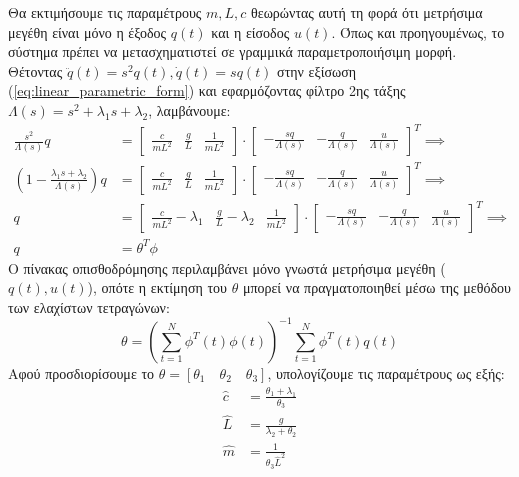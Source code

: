 \documentclass[a4paper,12pt]{article}
\begin{document}
Θα εκτιμήσουμε τις παραμέτρους $m, L, c$ θεωρώντας αυτή τη φορά ότι μετρήσιμα μεγέθη είναι μόνο η έξοδος $q(t)$ και η είσοδος $u(t)$. Όπως και προηγουμένως, το σύστημα πρέπει να μετασχηματιστεί σε γραμμικά παραμετροποιήσιμη μορφή. Θέτοντας $\ddot{q}(t) = s^2q(t), \dot{q}(t) = sq(t)$ στην εξίσωση (\ref{eq:linear_parametric_form}) και εφαρμόζοντας φίλτρο 2ης τάξης $\Lambda(s) = s^2 + \lambda_1 s + \lambda_2$, λαμβάνουμε:
\begin{equation}
\begin{aligned}
    \frac{s^2}{\Lambda(s)}q &=
    \left[
    \begin{matrix}
        \frac{c}{mL^2} & \frac{g}{L} & \frac{1}{mL^2}
    \end{matrix}
    \right]
    \cdot
    \left[
    \begin{matrix}
        -\frac{sq}{\Lambda(s)} & -\frac{q}{\Lambda(s)} & \frac{u}{\Lambda(s)}
    \end{matrix}
    \right]^T 
    \implies \\
    \left(1 - \frac{\lambda_1s + \lambda_2}{\Lambda(s)}\right)q &=
    \left[
    \begin{matrix}
        \frac{c}{mL^2} & \frac{g}{L} & \frac{1}{mL^2}
    \end{matrix}
    \right]
    \cdot
    \left[
    \begin{matrix}
        -\frac{sq}{\Lambda(s)} & -\frac{q}{\Lambda(s)} & \frac{u}{\Lambda(s)}
    \end{matrix}
    \right]^T
    \implies \\
    q &=
    \left[
    \begin{matrix}
        \frac{c}{mL^2}-\lambda_1 & \frac{g}{L}-\lambda_2 & \frac{1}{mL^2}
    \end{matrix}
    \right]
    \cdot
    \left[
    \begin{matrix}
        -\frac{sq}{\Lambda(s)} & -\frac{q}{\Lambda(s)} & \frac{u}{\Lambda(s)}
    \end{matrix}
    \right]^T
    \implies \\
    q &= \theta^T \phi
    \label{eq:linear_parametric_form3}   
\end{aligned}
\end{equation}
Ο πίνακας οπισθοδρόμησης περιλαμβάνει μόνο γνωστά μετρήσιμα μεγέθη ($q(t), u(t)$), οπότε η εκτίμηση του $\theta$ μπορεί να πραγματοποιηθεί μέσω της μεθόδου των ελαχίστων τετραγώνων:
\begin{equation}
    \theta = \left(\sum_{t=1}^N\phi^T(t)\phi(t)\right)^{-1}\sum_{t=1}^N\phi^T(t)q(t)
\end{equation}
Αφού προσδιορίσουμε το $\theta = [\theta_1 \quad \theta_2 \quad \theta_3]$, υπολογίζουμε τις παραμέτρους ως εξής:
\begin{equation}
    \begin{aligned}
        \hat{c} &= \frac{\theta_1 + \lambda_1}{\theta_3} \\
        \hat{L} &= \frac{g}{\lambda_2 + \theta_2} \\
        \hat{m} &= \frac{1}{\theta_3 \hat{L}^2}
    \end{aligned}
\end{equation}
\end{document}
